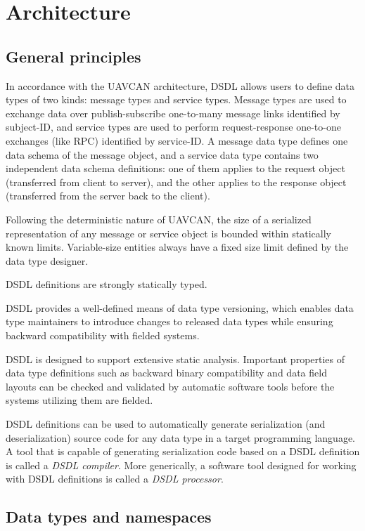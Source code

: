 \section{Architecture}

\subsection{General principles}

In accordance with the UAVCAN architecture, DSDL allows users to define data types of two kinds:
message types and service types.
Message types are used to exchange data over publish-subscribe one-to-many message links identified by subject-ID,
and service types are used to perform request-response one-to-one exchanges (like RPC) identified by service-ID.
A message data type defines one data schema of the message object,
and a service data type contains two independent data schema definitions:
one of them applies to the request object (transferred from client to server),
and the other applies to the response object (transferred from the server back to the client).

Following the deterministic nature of UAVCAN, the size of a serialized representation of any
message or service object is bounded within statically known limits.
Variable-size entities always have a fixed size limit defined by the data type designer.

DSDL definitions are strongly statically typed.

DSDL provides a well-defined means of data type versioning, which enables data type maintainers to introduce changes
to released data types while ensuring backward compatibility with fielded systems.

DSDL is designed to support extensive static analysis. Important properties of data type definitions such as
backward binary compatibility and data field layouts can be checked and validated by automatic software tools
before the systems utilizing them are fielded.

DSDL definitions can be used to automatically generate serialization (and deserialization) source code
for any data type in a target programming language.
A tool that is capable of generating serialization code based on a DSDL definition is called a \emph{DSDL compiler}.
More generically, a software tool designed for working with DSDL definitions is called a \emph{DSDL processor}.

\subsection{Data types and namespaces}

